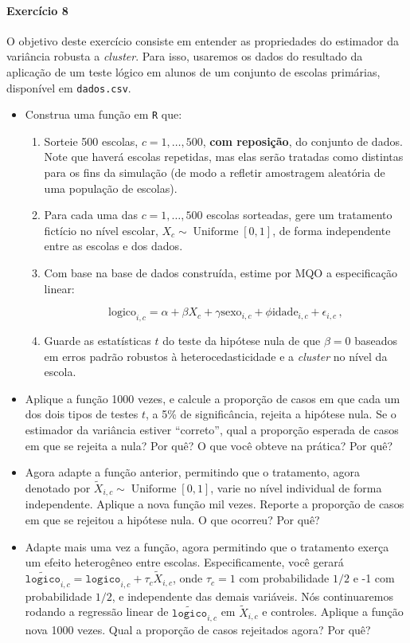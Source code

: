 \documentclass[10pt,a4paper]{article}
\begin{document}
 \paragraph{Exercício 8} O objetivo deste exercício consiste em entender as propriedades do estimador da variância robusta a \textit{cluster}. Para isso, usaremos os dados do resultado da aplicação de um teste lógico em alunos de um conjunto de escolas primárias, disponível em \texttt{dados.csv}.
 \begin{itemize}
 	\item[a] Construa uma função em \texttt{R} que:
 	\begin{enumerate}
 		\item Sorteie 500 escolas, $c=1,\ldots, 500$, \textbf{com reposição}, do conjunto de dados. Note que haverá escolas repetidas, mas elas serão tratadas como distintas para os fins da simulação (de modo a refletir amostragem aleatória de uma população de escolas).
 		\item Para cada uma das $c=1,\ldots, 500$ escolas sorteadas, gere um tratamento fictício no nível escolar, $X_c \sim \operatorname{Uniforme}[0,1]$, de forma independente entre as escolas e dos dados.
 		\item Com base na base de dados construída, estime por MQO a especificação linear:
 		
 		$$\text{logico}_{i,c} = \alpha + \beta X_{c} + \gamma \text{sexo}_{i,c} + \phi \text{idade}_{i,c} + \epsilon_{i,c}\, ,$$
 		\item Guarde as estatísticas $t$ do teste da hipótese nula de que $\beta =0$ baseados em erros padrão robustos à heterocedasticidade e a \textit{cluster} no nível da escola.
 	\end{enumerate}
 	\item[b] Aplique a função 1000 vezes, e calcule a proporção de casos em que cada um dos dois tipos de testes $t$, a 5\% de significância, rejeita a hipótese nula. Se o estimador da variância estiver ``correto'', qual a proporção esperada de casos em que se rejeita a nula?  Por quê? O que você obteve na prática? Por quê?
 	
 	\item[c] Agora adapte a função anterior, permitindo que o tratamento, agora denotado por $\tilde{X}_{i,c}\sim \operatorname{Uniforme}[0,1]$, varie no nível individual de forma independente. Aplique a nova função mil vezes. Reporte a proporção de casos em que se rejeitou a hipótese nula. O que ocorreu? Por quê?
 	\item[d] Adapte mais uma vez a função, agora permitindo que o tratamento exerça um efeito heterogêneo entre escolas. Especificamente, você gerará $\widetilde{\texttt{logico}}_{i,c} = \texttt{logico}_{i,c}  + \tau_c \tilde{X}_{i,c}$, onde $\tau_c = 1$ com probabilidade $1/2$ e -1 com probabilidade $1/2$, e independente das demais variáveis. Nós continuaremos rodando a regressão linear de $\tilde{\texttt{logico}}_{i,c}$ em $\tilde{X}_{i,c}$ e controles. Aplique a função nova 1000 vezes. Qual a proporção de casos rejeitados agora? Por quê? 
 \end{itemize}
 
\end{document}
